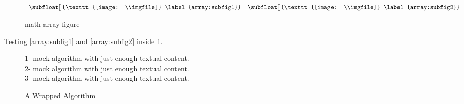 \documentclass{article}
\def\imgfile{../graphics/none.png}
\begin{document}
\begin{table*}[t]
  \footnotesize
  \hspace{15em}
  \caption{table with two resized, minipage, tabulars}
\end{table*}
\clearpage

\begin{figure}
  $ \begin{array}{cc}
    \subfloat[]{\texttt{[image: \\imgfile]} \label{array:subfig1}} &
    \subfloat[]{\texttt{[image: \\imgfile]} \label{array:subfig2}}
  \end{array} $
  \caption{math array figure}
  \label{array:fig}
\end{figure}
Testing \ref{array:subfig1} and \ref{array:subfig2} inside \ref{array:fig}.
\clearpage

\begin{wrapfigure}{r}{0.35\textwidth}
  \vspace{-2.25em}
  \centering
  \begin{minipage}{\linewidth}
  \begin{algorithm}[H]
  \caption{A Wrapped Algorithm}
  1- mock algorithm with just enough textual content.\\
  2- mock algorithm with just enough textual content.\\
  3- mock algorithm with just enough textual content.
  \end{algorithm}
  \end{minipage}
  \vspace{-1em}
\end{wrapfigure}
\vspace{-2mm}
\end{document}
